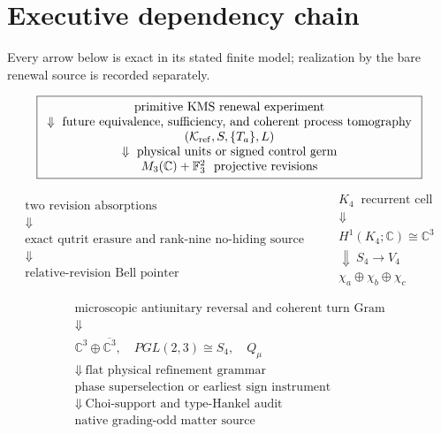 \documentclass[11pt,oneside,openany]{book}
\numberwithin{equation}{chapter}
\theoremstyle{definition}
\theoremstyle{remark}
\newcommand{\C}{\mathbb C}
\newcommand{\Fthree}{\mathbb F_3}
\begin{document}
\chapter*{Executive dependency chain}
Every arrow below is exact in its stated finite model; realization by the bare
renewal source is recorded separately.

\[
\boxed{\begin{array}{c}
\text{primitive KMS renewal experiment}\\
\Downarrow\ \text{future equivalence, sufficiency, and coherent process tomography}\\
(\mathcal K_{\rm ref},S,\{T_a\},L)\\
\Downarrow\ \text{physical units or signed control germ}\\
M_3(\C)+\Fthree^2\ \text{ projective revisions}
\end{array}}
\]

\[
\boxed{\begin{array}{c}
\text{two revision absorptions}\\
\Downarrow\\
\text{exact qutrit erasure and rank-nine no-hiding source}\\
\Downarrow\\
\text{relative-revision Bell pointer}
\end{array}}
\qquad
\boxed{\begin{array}{c}
K_4\ \text{ recurrent cell}\\
\Downarrow\\
H^1(K_4;\C)\cong\C^3\\
\Downarrow\ S_4\to V_4\\
\chi_a\oplus\chi_b\oplus\chi_c
\end{array}}
\]

\[
\boxed{\begin{array}{c}
\text{microscopic antiunitary reversal and coherent turn Gram}\\
\Downarrow\\
\C^3\oplus\overline{\C^3},\quad PGL(2,3)\cong S_4,\quad Q_\mu\\
\Downarrow\ \text{flat physical refinement grammar}\\
\text{phase superselection or earliest sign instrument}\\
\Downarrow\ \text{Choi-support and type-Hankel audit}\\
\text{native grading-odd matter source}
\end{array}}
\]
\end{document}
